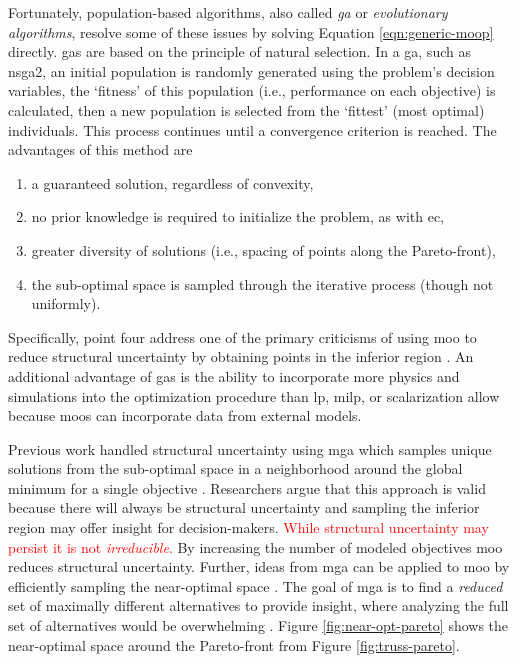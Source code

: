 Fortunately, population-based algorithms, also called \textit{\ac{ga}} or
\textit{evolutionary algorithms}, resolve some of these issues by solving
Equation \ref{eqn:generic-moop} directly. \Acp{ga} are based on the principle of
natural selection. In a \ac{ga}, such as \ac{nsga2}, an initial population is
randomly generated using the problem's decision variables, the `fitness' of this
population (i.e., performance on each objective) is calculated, then a new
population is selected from the `fittest' (most optimal) individuals. This
process continues until a convergence criterion is reached. The advantages of
this method are
\begin{enumerate}
    \item a guaranteed solution, regardless of convexity,
    \item no prior knowledge is required to initialize the problem, as with
    \ac{ec},
    \item greater diversity of solutions (i.e., spacing of points along the
    Pareto-front),
    \item the sub-optimal space is sampled through the iterative process (though
    not uniformly).
\end{enumerate}
Specifically, point four address one of the primary criticisms of using \ac{moo}
to reduce structural uncertainty by obtaining points in the inferior region
\cite{loughlin_genetic_2001,zechman_evolutionary_2004,
zechman_evolutionary_2013}. An additional advantage of \acp{ga} is the ability
to incorporate more physics and simulations into the optimization procedure than
\ac{lp}, \ac{milp}, or scalarization allow \cite{loughlin_genetic_2001} because 
\acp{moo} can incorporate data from external models. 

Previous work handled structural uncertainty using \ac{mga} which samples unique
solutions from the sub-optimal space in a neighborhood around the global minimum
for a single objective \cite{decarolis_using_2011}. Researchers argue that this
approach is valid because there will always be structural uncertainty and
sampling the inferior region may offer insight for decision-makers.
\textcolor{red}{While structural uncertainty may persist it is not
\textit{irreducible}.} By increasing the number of modeled objectives \ac{moo}
reduces structural uncertainty. Further, ideas from \ac{mga} can be applied to
\ac{moo} by efficiently sampling the near-optimal space
\cite{loughlin_genetic_2001,
zechman_evolutionary_2004,zechman_evolutionary_2013,pajares_comparison_2021}.
The goal of \ac{mga} is to find a \textit{reduced} set of maximally different
alternatives to provide insight, where analyzing the full set of alternatives
would be overwhelming \cite{decarolis_using_2011, pajares_comparison_2021}.
Figure \ref{fig:near-opt-pareto} shows the near-optimal space around the
Pareto-front from Figure \ref{fig:truss-pareto}.

